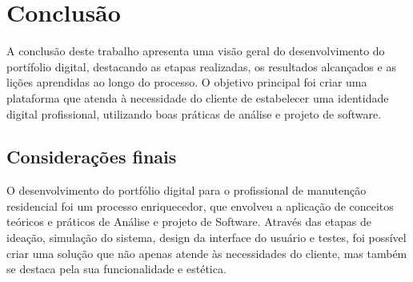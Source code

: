 \chapter{Conclusão}
\label{chap:conc}

A conclus\~ao deste trabalho apresenta uma vis\~ao geral do
desenvolvimento do port\'ifolio digital, destacando as etapas
realizadas, os resultados alcançados e as li\c{c}\~oes aprendidas ao longo do processo. O objetivo principal foi criar uma plataforma que atenda \`a necessidade do cliente de estabelecer uma identidade digital profissional, utilizando boas pr\'aticas de análise e projeto de software.



\section{Considerações finais}
\label{sec:consid}

O desenvolvimento do portfólio digital para o profissional de manutenção residencial foi um processo enriquecedor, que envolveu a aplicação de conceitos teóricos e práticos de Análise e projeto de Software. Através das etapas de ideação, simulação do sistema, design da interface do usuário e testes, foi possível criar uma solução que não apenas atende às necessidades do cliente, mas também se destaca pela sua funcionalidade e estética.
